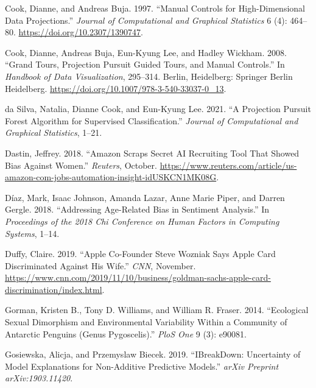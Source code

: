 \documentclass[
]{article}
\newlength{\cslhangindent}
\newlength{\cslentryspacingunit} %
\newenvironment{CSLReferences}[2] %
 {%
  \setlength{\parindent}{0pt}
  \ifodd #1
  \let\oldpar\par
  \def\par{\hangindent=\cslhangindent\oldpar}
  \fi
  \setlength{\parskip}{#2\cslentryspacingunit}
 }%
 {}
\begin{document}
\begin{CSLReferences}{1}{0}
\leavevmode{}%
Cook, Dianne, and Andreas Buja. 1997. {``Manual {Controls} for {High}-{Dimensional} {Data} {Projections}.''} \emph{Journal of Computational and Graphical Statistics} 6 (4): 464--80. \url{https://doi.org/10.2307/1390747}.

\leavevmode{}%
Cook, Dianne, Andreas Buja, Eun-Kyung Lee, and Hadley Wickham. 2008. {``Grand {Tours}, {Projection} {Pursuit} {Guided} {Tours}, and {Manual} {Controls}.''} In \emph{Handbook of {Data} {Visualization}}, 295--314. Berlin, Heidelberg: Springer Berlin Heidelberg. \url{https://doi.org/10.1007/978-3-540-33037-0_13}.

\leavevmode{}%
da Silva, Natalia, Dianne Cook, and Eun-Kyung Lee. 2021. {``A {Projection} {Pursuit} {Forest} {Algorithm} for {Supervised} {Classification}.''} \emph{Journal of Computational and Graphical Statistics}, 1--21.

\leavevmode{}%
Dastin, Jeffrey. 2018. {``Amazon Scraps Secret {AI} Recruiting Tool That Showed Bias Against Women.''} \emph{Reuters}, October. \url{https://www.reuters.com/article/us-amazon-com-jobs-automation-insight-idUSKCN1MK08G}.

\leavevmode{}%
Díaz, Mark, Isaac Johnson, Amanda Lazar, Anne Marie Piper, and Darren Gergle. 2018. {``Addressing Age-Related Bias in Sentiment Analysis.''} In \emph{Proceedings of the 2018 Chi Conference on Human Factors in Computing Systems}, 1--14.

\leavevmode{}%
Duffy, Claire. 2019. {``Apple Co-Founder {Steve} {Wozniak} Says {Apple} {Card} Discriminated Against His Wife.''} \emph{CNN}, November. \url{https://www.cnn.com/2019/11/10/business/goldman-sachs-apple-card-discrimination/index.html}.

\leavevmode{}%
Gorman, Kristen B., Tony D. Williams, and William R. Fraser. 2014. {``Ecological Sexual Dimorphism and Environmental Variability Within a Community of {Antarctic} Penguins (Genus {Pygoscelis}).''} \emph{PloS One} 9 (3): e90081.

\leavevmode{}%
Gosiewska, Alicja, and Przemyslaw Biecek. 2019. {``{IBreakDown}: {Uncertainty} of Model Explanations for Non-Additive Predictive Models.''} \emph{arXiv Preprint arXiv:1903.11420}.


\end{CSLReferences}
\end{document}
